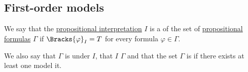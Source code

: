 \subsection{First-order models}\label{subsec:first_order_models}

\begin{definition}\label{def:propositional_model}
  We say that the \hyperref[def:propositional_valuation/interpretation]{propositional interpretation} \( I \) is a  of the set of \hyperref[def:propositional_syntax/formula]{propositional formulas} \( \Gamma \) if \( \Bracks{\varphi}_I = T \) for every formula \( \varphi \in \Gamma \).

  We also say that \( \Gamma \) is  under \( I \), that \( I \)  \( \Gamma \) and that the set \( \Gamma \) is  if there exists at least one model it.
\end{definition}

